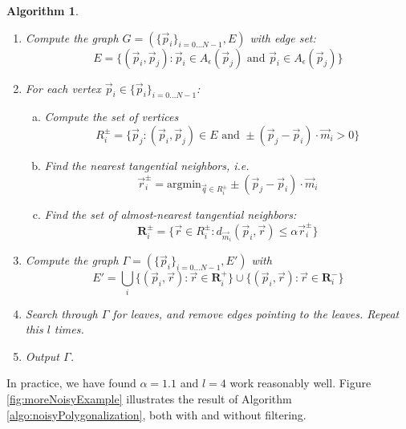 \documentclass{article}
\newtheorem{algo}{Algorithm}
\numberwithin{cntr}{section}
\numberwithin{equation}{section}
\newcommand{\vp}[0]{{\vec{p}}}
\newcommand{\vq}[0]{{\vec{q}}}
\newcommand{\vr}[0]{{\vec{r}}}
\newcommand{\vm}[0]{{\vec{m}}}
\newcommand{\OtoN}{{0 \ldots N-1}}
\newcommand{\pointData}{{ \{ \vp_{i} \}_{i=\OtoN} }}
\newcommand{\allowed}[2]{ { A_{#1}(#2) } }
\begin{document}
\begin{algo}
  \begin{enumerate}
  \item Compute the graph $G = (\pointData, E)$ with edge set:
    \begin{equation*}
      E = \{ (\vp_{i},\vp_{j}) : \vp_{i} \in \allowed{\epsilon}{\vp_{j}} \textrm{~and~} \vp_{i} \in \allowed{\epsilon}{\vp_{j}}\}
    \end{equation*}
  \item For each vertex $\vp_{i} \in \pointData$:
    \begin{enumerate}[a.]
    \item Compute the set of vertices
      \begin{equation*}
        R^{\pm}_{i} = \{ \vp_{j} : (\vp_{i}, \vp_{j}) \in E \textrm{~and~} \pm (\vp_{j}-\vp_{i}) \cdot \vm_{i} > 0 \}
      \end{equation*}
    \item Find the nearest tangential neighbors, i.e.
      \begin{equation*}
        \vr^{\pm}_{i} = \textrm{argmin}_{\vq \in R^{\pm}_{i}} \pm (\vp_{j}-\vp_{i}) \cdot \vm_{i}
      \end{equation*}
    \item Find the set of almost-nearest tangential neighbors:
      \begin{equation*}
        \mathbf{R}^{\pm}_{i} = \{ \vr \in R^{\pm}_{i} : d_{\vm_{i}}(\vp_{i}, \vr) \leq \alpha \vr^{\pm}_{i} \}
      \end{equation*}
    \end{enumerate}
  \item Compute the graph $\Gamma = ( \pointData, E')$ with
    \begin{equation*}
      E' = \bigcup_{i} \{ (\vp_{i}, \vr) : \vr \in \mathbf{R}^{+}_{i} \} \cup \{ (\vp_{i}, \vr) : \vr \in \mathbf{R}^{-}_{i} \}
    \end{equation*}
  \item Search through $\Gamma$ for leaves, and remove edges pointing to the leaves. Repeat this $l$ times.
  \item Output $\Gamma$.
  \end{enumerate}
\end{algo}

In practice, we have found $\alpha=1.1$ and $l=4$ work reasonably well. Figure \ref{fig:moreNoisyExample} illustrates the result of Algorithm \ref{algo:noisyPolygonalization}, both with and without filtering.
\end{document}
